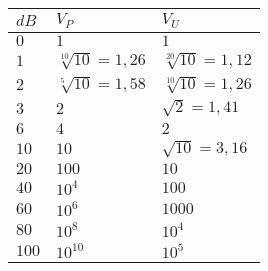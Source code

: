     \begin{minipage}{0.5\columnwidth}
    \renewcommand{\arraystretch}{0.9}
    \begin{table}[H]
    \centering
    \begin{tabular}{|l|l|l|}
    \hline
    $dB$      & $V_P$                            & $V_U$                  \\ \hline
    $0$       & $1$                              & $1$                    \\ \hline
    $1$       & $\sqrt[10]{10}=1,26$             & $\sqrt[20]{10}=1,12$   \\ \hline
    $2$       & $\sqrt[5]{10}=1,58$              & $\sqrt[10]{10}=1,26$   \\ \hline
    $3$       & $2$                              & $\sqrt{2}=1,41$        \\ \hline
    $6$       & $4$                              & $2$                    \\ \hline
    $10$      & $10$                             & $\sqrt{10}=3,16$       \\ \hline
    $20$      & $100$                            & $10$                   \\ \hline
    $40$      & $10^4$                           & $100$                  \\ \hline
    $60$      & $10^6$                           & $1000$                 \\ \hline
    $80$      & $10^8$                           & $10^4$                 \\ \hline
    $100$     & $10^{10}$                        & $10^5$                 \\ \hline
    \end{tabular}
    \end{table}
    \end{minipage}
